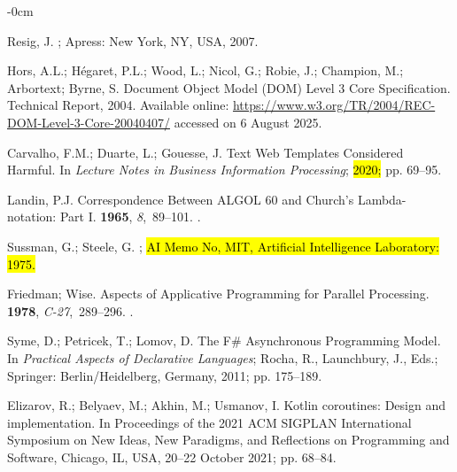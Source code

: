 \documentclass[software,article,accept,pdftex,moreauthors]{Definitions/mdpi}
\begin{document}
\begin{adjustwidth}{-\extralength}{0cm}
\begin{thebibliography}{999}
Resig, J.
; Apress: New York, NY, USA, 2007.

Hors, A.L.; Hégaret, P.L.; Wood, L.; Nicol, G.; Robie, J.; Champion, M.;
  Arbortext; Byrne, S.
\newblock Document Object Model (DOM) Level 3 Core Specification.
\newblock Technical Report, 2004. Available online: \url{https://www.w3.org/TR/2004/REC-DOM-Level-3-Core-20040407/} accessed on 6 August 2025.

Carvalho, F.M.; Duarte, L.; Gouesse, J.
\newblock Text Web Templates Considered Harmful.
\newblock In {\em Lecture Notes in Business Information Processing}; \hl{{2020};} %
 pp. 69--95.

Landin, P.J.
\newblock Correspondence Between ALGOL 60 and Church's Lambda-notation: Part I.
 {\bf 1965}, {\em 8},~89--101.
.

Sussman, G.; Steele, G.
; \hl{AI Memo
  No, MIT, Artificial Intelligence Laboratory:  1975.} %


Friedman; Wise.
\newblock Aspects of Applicative Programming for Parallel Processing.
 {\bf 1978}, {\em
  C-27},~289--296.
.

Syme, D.; Petricek, T.; Lomov, D.
\newblock The F{\#} Asynchronous Programming Model.
\newblock In \emph{Practical Aspects of Declarative Languages};
  Rocha, R., Launchbury, J., Eds.; Springer: Berlin/Heidelberg, Germany, 2011; pp. 175--189.

Elizarov, R.; Belyaev, M.; Akhin, M.; Usmanov, I.
\newblock Kotlin coroutines: Design and implementation.
\newblock In Proceedings of the 2021 ACM SIGPLAN
  International Symposium on New Ideas, New Paradigms, and Reflections on
  Programming and Software, Chicago, IL, USA, 20--22 October 2021; pp. 68--84.


\end{thebibliography}
\end{adjustwidth}
\end{document}
